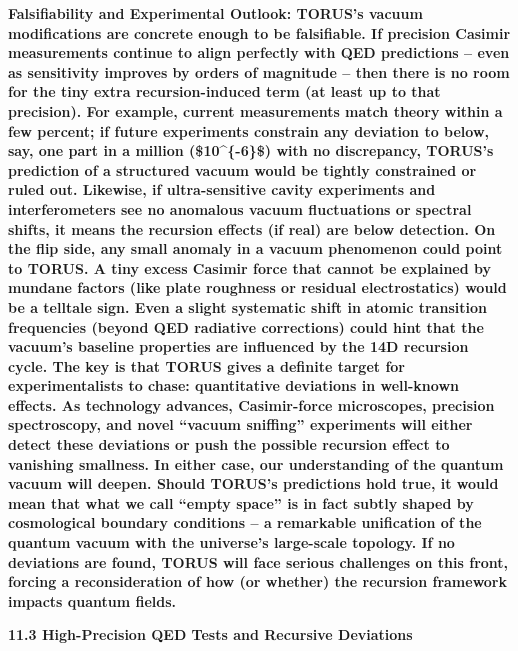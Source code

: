 \documentclass[
]{article}
\begin{document}
\textbf{Falsifiability and Experimental Outlook: TORUS's vacuum
modifications are concrete enough to be falsifiable. If precision
Casimir measurements continue to align perfectly with QED predictions --
even as sensitivity improves by orders of magnitude -- then there is no
room for the tiny extra recursion-induced term (at least up to that
precision). For example, current measurements match theory within a few
percent; if future experiments constrain any deviation to below, say,
one part in a million (\$10\^{}\{-6\}\$) with no discrepancy, TORUS's
prediction of a structured vacuum would be tightly constrained or ruled
out. Likewise, if ultra-sensitive cavity experiments and interferometers
see no anomalous vacuum fluctuations or spectral shifts, it means the
recursion effects (if real) are below detection. On the flip side, any
small anomaly in a vacuum phenomenon could point to TORUS. A tiny excess
Casimir force that cannot be explained by mundane factors (like plate
roughness or residual electrostatics) would be a telltale sign. Even a
slight systematic shift in atomic transition frequencies (beyond QED
radiative corrections) could hint that the vacuum's baseline properties
are influenced by the 14D recursion cycle. The key is that TORUS gives a
definite target for experimentalists to chase: quantitative deviations
in well-known effects. As technology advances, Casimir-force
microscopes, precision spectroscopy, and novel ``vacuum sniffing''
experiments will either detect these deviations or push the possible
recursion effect to vanishing smallness. In either case, our
understanding of the quantum vacuum will deepen. Should TORUS's
predictions hold true, it would mean that what we call ``empty space''
is in fact subtly shaped by cosmological boundary conditions -- a
remarkable unification of the quantum vacuum with the universe's
large-scale topology. If no deviations are found, TORUS will face
serious challenges on this front, forcing a reconsideration of how (or
whether) the recursion framework impacts quantum fields.}

\textbf{11.3 High-Precision QED Tests and Recursive Deviations}
\end{document}
